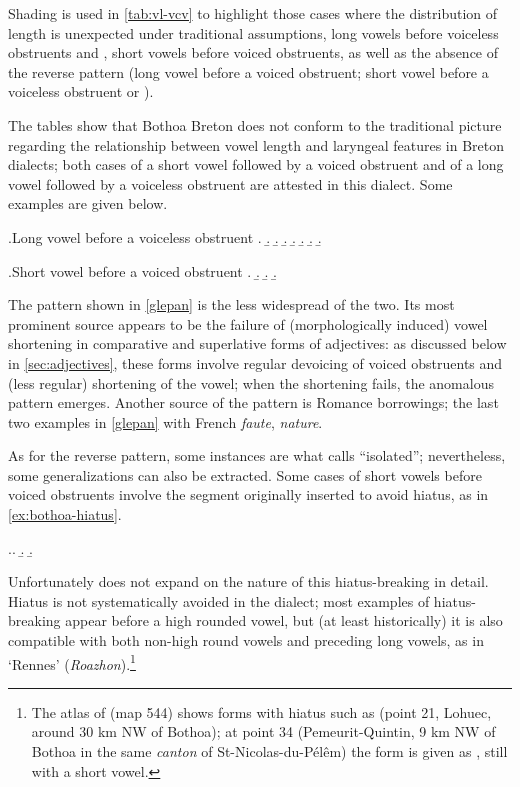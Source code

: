 Shading is used in \cref{tab:vl-vcv} to highlight those cases where the distribution of length is unexpected under traditional assumptions, \ie long vowels before voiceless obstruents and \ipa{[m]}, short vowels before voiced obstruents, as well as the absence of the reverse pattern (long vowel before a voiced obstruent; short vowel before a voiceless obstruent or \ipa{[m]}).

The tables show that Bothoa Breton does not conform to the traditional picture regarding the relationship between vowel length and laryngeal features in Breton dialects; both cases of a short vowel followed by a voiced obstruent and of a long vowel followed by a voiceless obstruent are attested in this dialect. Some examples are given below.

\ex.\label{glepan}Long vowel before a voiceless obstruent
\a.
\b.\mbi{[ˈɡlepã]}
\b.
\b.\mbi{[r̥ɛzoˈnapɒh]}
\b.
\b.\mbi{[ˈjɒtən]}
\b.
\b.

\ex.Short vowel before a voiced obstruent
\a.
\b.
\b.
\b.


The pattern shown in \cref{glepan} is the less widespread of the two. Its most prominent source appears to be the failure of (morphologically induced) vowel shortening in comparative and superlative forms of adjectives: as discussed below in \cref{sec:adjectives}, these forms involve regular devoicing of voiced obstruents and (less regular) shortening of the vowel; when the shortening fails, the anomalous pattern emerges. Another source of the pattern is Romance borrowings; \cf the last two examples in \ref{glepan} with French \emph{faute}, \emph{nature}.

As for the reverse pattern, some instances are what \citet{humphreys95:_phonol_bothoa_saint_nicol_pelem} calls \enquote{isolated}; nevertheless, some  generalizations can also be extracted. Some cases of short vowels before voiced obstruents involve the segment \ipa{[v]} originally inserted to avoid hiatus, as in \cref{ex:bothoa-hiatus}.

\ex.\label{ex:bothoa-hiatus}\a.
\b.
\b.

Unfortunately \citet{humphreys95:_phonol_bothoa_saint_nicol_pelem} does not expand on the nature of this hiatus\hyp breaking in detail. Hiatus is not systematically avoided in the dialect; most examples of hiatus\hyp breaking \ipa{[v]} appear before a high rounded vowel, but (at least historically) it is also compatible  with both non-high round vowels and preceding long vowels, as in \ipa{[ˈr̥aːvon]} `Rennes' (\emph{Roazhon}).\footnote{The atlas of \citet{le63:_atlas_basse_bretag} (map 544) shows forms with hiatus such as \ipa{[Rãõn]} (point 21, Lohuec, around 30 km NW of Bothoa); at point 34 (Pemeurit-Quintin, 9 km NW of Bothoa in the same \emph{canton} of St-Nicolas-du-Pélêm) the form is given as \ipa{[Rã\textsubscript{w}õn]}, still with a short vowel.}

